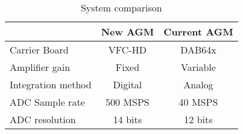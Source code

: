 \begin{table}[!hbt]
   \centering
   \begin{tabular}{ l || c  c }
       \toprule
       & \textbf{New AGM} & \textbf{Current AGM} \\
       \hline
        Carrier Board & VFC-HD & DAB64x \\
        Amplifier gain & Fixed & Variable \\
        Integration method & Digital & Analog \\
        ADC Sample rate & 500 MSPS & 40 MSPS \\
        ADC resolution & 14 bits & 12 bits \\
       \bottomrule
   \end{tabular}
   \caption{System comparison}
   \label{tab:system_comparison}
\end{table}

